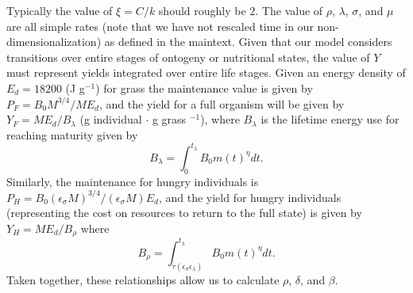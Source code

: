 \documentclass[twocolumn,preprintnumbers,amsmath,amssymb,superscriptaddress]{revtex4}
\begin{document}
\begin{bibunit}[unsrt]

Typically the value of $\xi=C/k$ should roughly be $2$. The value of $\rho$, $\lambda$, $\sigma$, and $\mu$ are all simple rates (note that we have not rescaled time in our non-dimensionalization) as defined in the maintext. Given that our model considers transitions over entire stages of ontogeny or nutritional states, the value of $Y$ must represent yields integrated over entire life stages. Given an energy density of $E_{d}=18200$ (J g$^{-1}$) for grass \cite{estermann} the maintenance value is given by $P_{F}=B_{0}M^{3/4}/ME_{d}$, and the yield for a full organism will be given by $Y_{F}=ME_{d}/B_{\lambda}$ (g individual $\cdot$ g grass $^{-1}$), where $B_{\lambda}$ is the lifetime energy use for reaching maturity given by
\begin{equation}
B_{\lambda}=\int_{0}^{t_{\lambda}}B_{0}m\left(t\right)^{\eta}dt.
\end{equation}
Similarly, the maintenance for hungry individuals is $P_{H}=B_{0}(\epsilon_{\sigma}M)^{3/4}/(\epsilon_{\sigma}M)E_{d}$, and the yield for hungry individuals (representing the cost on resources to return to the full state) is given by $Y_{H}=ME_{d}/B_{\rho}$ where
\begin{equation}
B_{\rho}=\int_{\tau\left(\epsilon_{\sigma}\epsilon_{\lambda}\right)}^{t_{\lambda}}B_{0}m\left(t\right)^{\eta}dt.
\end{equation}
Taken together, these relationships allow us to calculate $\rho$, $\delta$, and $\beta$.


\end{bibunit}
\end{document}
